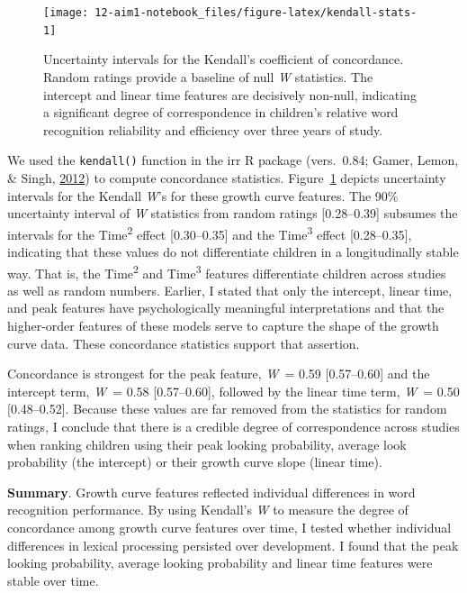 \documentclass [11pt, proquest] {uwthesis}[2015/03/03]
\begin{document}
\begin{figure}
\texttt{[image: 12-aim1-notebook\_files/figure-latex/kendall-stats-1]} \caption{Uncertainty intervals for the Kendall's coefficient
of concordance. Random ratings provide a baseline of null \emph{W}
statistics. The intercept and linear time features are decisively
non-null, indicating a significant degree of correspondence in
children's relative word recognition reliability and efficiency over
three years of study.}\label{fig:kendall-stats}
\end{figure}
We used the \texttt{kendall()} function in the irr R package
(vers.~0.84; Gamer, Lemon, \& Singh, \protect\hyperlink{ref-irr}{2012})
to compute concordance statistics. Figure~\ref{fig:kendall-stats}
depicts uncertainty intervals for the Kendall \emph{W}'s for these
growth curve features. The 90\% uncertainty interval of \emph{W}
statistics from random ratings {[}0.28--0.39{]} subsumes the intervals
for the Time\textsuperscript{2} effect {[}0.30--0.35{]} and the
Time\textsuperscript{3} effect {[}0.28--0.35{]}, indicating that these
values do not differentiate children in a longitudinally stable way.
That is, the Time\textsuperscript{2} and Time\textsuperscript{3}
features differentiate children across studies as well as random
numbers. Earlier, I stated that only the intercept, linear time, and
peak features have psychologically meaningful interpretations and that
the higher-order features of these models serve to capture the shape of
the growth curve data. These concordance statistics support that
assertion.

Concordance is strongest for the peak feature, \emph{W}~= 0.59
{[}0.57--0.60{]} and the intercept term, \emph{W}~= 0.58
{[}0.57--0.60{]}, followed by the linear time term, \emph{W}~= 0.50
{[}0.48--0.52{]}. Because these values are far removed from the
statistics for random ratings, I conclude that there is a credible
degree of correspondence across studies when ranking children using
their peak looking probability, average look probability (the intercept)
or their growth curve slope (linear time).

\textbf{Summary}. Growth curve features reflected individual differences
in word recognition performance. By using Kendall's \emph{W} to measure
the degree of concordance among growth curve features over time, I
tested whether individual differences in lexical processing persisted
over development. I found that the peak looking probability, average
looking probability and linear time features were stable over time.
\end{document}
